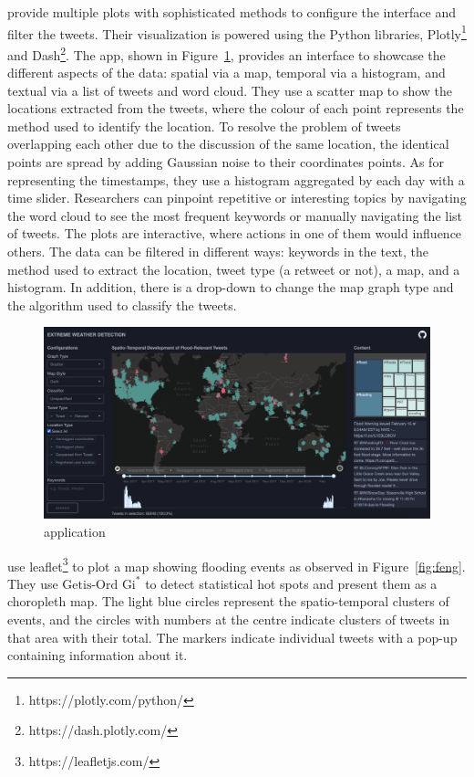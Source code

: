  provide multiple plots with sophisticated
methods to configure the interface and filter the tweets. Their visualization is powered using the Python
libraries, Plotly\footnote{https://plotly.com/python/} and Dash\footnote{https://dash.plotly.com/}.
The app, shown in Figure~\ref{fig:peter}, provides an interface to showcase the different aspects of the
data: spatial via a map, temporal via a histogram, and textual via a list of tweets and word cloud.
They use a scatter map to show the locations extracted from the tweets, where the colour of each
point represents the method used to identify the location. To resolve the problem of tweets
overlapping each other due to the discussion of the same location, the identical points are
spread by adding Gaussian noise to their coordinates points. As for representing the timestamps,
they use a histogram aggregated by each day with a time slider. Researchers can pinpoint repetitive
or interesting topics by navigating the word cloud to see the most frequent keywords or manually
navigating the list of tweets. The plots are interactive, where actions in one of them would
influence others. The data can be filtered in different ways: keywords in the text, the method used
to extract the location, tweet type (a retweet or not), a map, and a histogram. In addition, there is a
drop-down to change the map graph type and the algorithm used to classify the tweets.

\begin{figure}[H]
\begin{center}
  \includegraphics[width=\columnwidth]{./images/peter.png}
\end{center}
\caption{ application}
\label{fig:peter}
\end{figure}

 use leaflet\footnote{https://leafletjs.com/} to plot a map showing flooding events as
observed in Figure~\ref{fig:feng}. They use $\text{Getis-Ord Gi}^{\ast}$ \cite{ordLocalSpatialAutocorrelation2010}
to detect statistical hot spots and present them as a choropleth map. The light blue circles
represent the spatio-temporal clusters of events, and the circles with numbers at the centre
indicate clusters of tweets in that area with their total. The markers indicate individual tweets
with a pop-up containing information about it.

